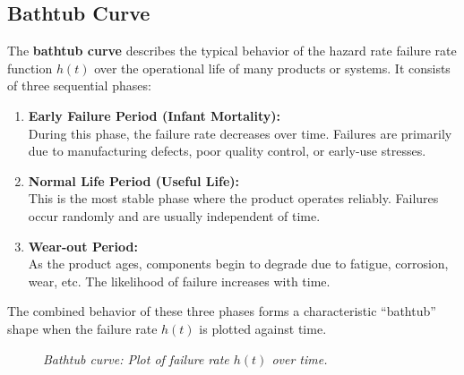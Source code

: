 \documentclass[twoside]{book}
\begin{document}
\subsection{Bathtub Curve}

The \textbf{bathtub curve} describes the typical behavior of the hazard rate {failure rate function} \( h(t) \) over the operational life of many products or systems. It consists of three sequential phases:

\begin{enumerate}
    \item \textbf{Early Failure Period (Infant Mortality):} \\
    During this phase, the failure rate decreases over time. Failures are primarily due to manufacturing defects, poor quality control, or early-use stresses. \\

    \item \textbf{Normal Life Period (Useful Life):} \\
    This is the most stable phase where the product operates reliably. Failures occur randomly and are usually independent of time. \\

    \item \textbf{Wear-out Period:} \\
    As the product ages, components begin to degrade due to fatigue, corrosion, wear, etc. The likelihood of failure increases with time.
\end{enumerate}

The combined behavior of these three phases forms a characteristic ``bathtub'' shape when the failure rate \( h(t) \) is plotted against time.

\begin{figure}[H]
\centering
{}
\caption{\textit{Bathtub curve: Plot of failure rate \( h(t) \) over time.}}
\end{figure}
\end{document}
